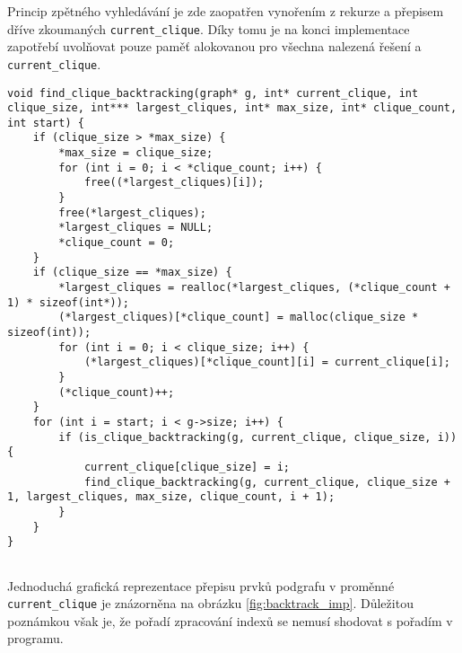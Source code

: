 \documentclass[a4paper]{article}
\begin{document}
        \noindent
        Princip zpětného vyhledávání je zde zaopatřen vynořením z rekurze a přepisem dříve zkoumaných \lstinline{current_clique}. Díky tomu je na konci implementace zapotřebí uvolňovat pouze paměť alokovanou pro všechna nalezená řešení a \lstinline{current_clique}.\\

         \begin{lstlisting}[caption={Zjednodušený kód pro rekurzivní funkci využitou při implementaci metody zpětným vyhledáváním.}, captionpos=b]
void find_clique_backtracking(graph* g, int* current_clique, int clique_size, int*** largest_cliques, int* max_size, int* clique_count, int start) {
    if (clique_size > *max_size) {
        *max_size = clique_size;
        for (int i = 0; i < *clique_count; i++) {
            free((*largest_cliques)[i]);
        }
        free(*largest_cliques);
        *largest_cliques = NULL;
        *clique_count = 0;
    }
    if (clique_size == *max_size) {
        *largest_cliques = realloc(*largest_cliques, (*clique_count + 1) * sizeof(int*));
        (*largest_cliques)[*clique_count] = malloc(clique_size * sizeof(int));
        for (int i = 0; i < clique_size; i++) {  
            (*largest_cliques)[*clique_count][i] = current_clique[i];
        }
        (*clique_count)++; 
    }
    for (int i = start; i < g->size; i++) {
        if (is_clique_backtracking(g, current_clique, clique_size, i)) {
            current_clique[clique_size] = i;
            find_clique_backtracking(g, current_clique, clique_size + 1, largest_cliques, max_size, clique_count, i + 1);
        }
    }
}
        
         \end{lstlisting}

         \noindent
         Jednoduchá grafická reprezentace přepisu prvků podgrafu v proměnné \lstinline{current_clique} je znázorněna na obrázku \ref{fig:backtrack_imp}. Důležitou poznámkou však je, že pořadí zpracování indexů se nemusí shodovat s pořadím v programu.
\end{document}
